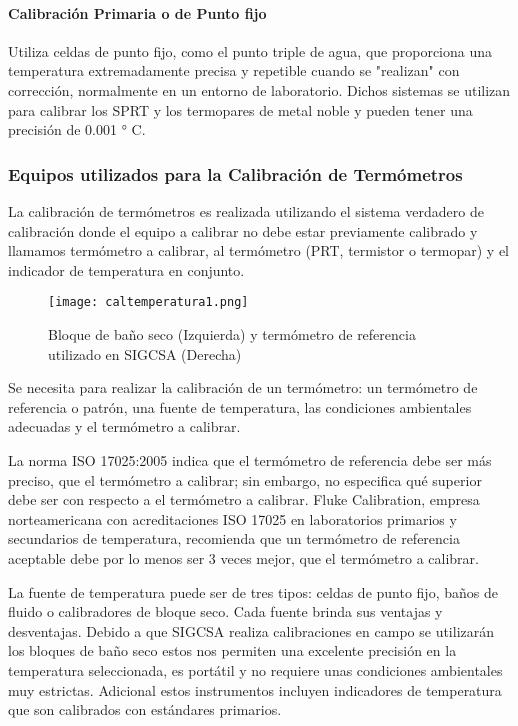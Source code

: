 \paragraph{Calibración Primaria o de Punto fijo} 
Utiliza celdas de punto fijo, como el punto triple de agua, que proporciona una temperatura extremadamente precisa y repetible cuando se "realizan" con corrección, normalmente en un entorno de laboratorio. Dichos sistemas se utilizan para calibrar los SPRT y los termopares de metal noble y pueden tener una precisión de 0.001 ° C.\cite{temperatura-fluke}

\subsubsection{Equipos utilizados para la Calibración de Termómetros}

\par 
La calibración de termómetros es realizada utilizando el sistema verdadero de calibración donde el equipo a calibrar no debe estar previamente calibrado y llamamos termómetro a calibrar, al termómetro (PRT, termistor o termopar) y el indicador de temperatura en conjunto.

\begin{figure}[H]
	\centering
	\texttt{[image: caltemperatura1.png]}
	\caption{Bloque de baño seco (Izquierda) y termómetro de referencia utilizado en SIGCSA (Derecha)}
\end{figure}

\par \noindent
Se necesita para realizar la calibración de un termómetro: un termómetro de referencia o patrón, una fuente de temperatura, las condiciones ambientales adecuadas y el termómetro a calibrar.

\par \noindent
La norma ISO 17025:2005 indica que el termómetro de referencia debe ser más preciso, que el termómetro a calibrar; sin embargo, no especifica qué superior debe ser con respecto a el termómetro a calibrar. Fluke Calibration, empresa norteamericana con acreditaciones ISO 17025 en laboratorios primarios y secundarios de temperatura, recomienda que un termómetro de referencia aceptable debe por lo menos ser 3 veces mejor, que el termómetro a calibrar.



\par \noindent
La fuente de temperatura puede ser de tres tipos: celdas de punto fijo, baños de fluido o calibradores de bloque seco.
Cada fuente brinda sus ventajas y desventajas. Debido a que SIGCSA realiza calibraciones en campo se utilizarán los bloques de baño seco estos nos permiten una excelente precisión en la temperatura seleccionada, es portátil y no requiere unas condiciones ambientales muy estrictas.
Adicional estos instrumentos incluyen indicadores de temperatura que son calibrados con estándares primarios.

